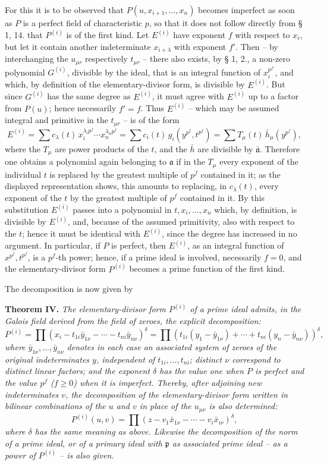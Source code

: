 \documentclass[11pt]{article}
\providecommand{\frakp}{\mathfrak p}
\providecommand{\fraka}{\mathfrak a}
\providecommand{\fraka}{\mathfrak a}
\providecommand{\frakp}{\mathfrak p}
\providecommand{\frakp}{\mathfrak p}
\begin{document}
For this it is to be observed that $P(u,x_{i+1},\ldots,x_n)$ becomes imperfect as soon as $P$ is a perfect field of characteristic $p$, so that it does not follow directly from § 1, 14. that $P^{(i)}$ is of the first kind. Let $E^{(i)}$ have exponent $f$ with respect to $x_i$, but let it contain another indeterminate $x_{i+\lambda}$ with exponent $f'$. Then -- by interchanging the $u_{\mu r}$ respectively $t_{\mu r}$ -- there also exists, by § 1, 2., a non-zero polynomial $G^{(i)}$, divisible by the ideal, that is an integral function of $x_i^{p^{f'}}$, and which, by definition of the elementary-divisor form, is divisible by $E^{(i)}$. But since $G^{(i)}$ has the same degree as $E^{(i)}$, it must agree with $E^{(i)}$ up to a factor from $P(u)$; hence necessarily $f'=f$. Thus $E^{(i)}$ -- which may be assumed integral and primitive in the $t_{\mu r}$ -- is of the form
\[
  E^{(i)}=\sum c_\lambda(t)\,x_i^{\lambda_i p^f}\cdots x_n^{\lambda_n p^f}
       =\sum c_i(t)\,g_i(y^{p^f},t^{p^f})
       =\sum T_\mu(t)\,\bar h_\mu(y^{p^f}),
\]
where the $T_\mu$ are power products of the $t$, and the $\bar h$ are divisible by $\bar{\fraka}$. Therefore one obtains a polynomial again belonging to $\fraka$ if in the $T_\mu$ every exponent of the individual $t$ is replaced by the greatest multiple of $p^f$ contained in it; as the displayed representation shows, this amounts to replacing, in $c_\lambda(t)$, every exponent of the $t$ by the greatest multiple of $p^f$ contained in it. By this substitution $E^{(i)}$ passes into a polynomial in $t,x_i,\ldots,x_n$ which, by definition, is divisible by $E^{(i)}$, and, because of the assumed primitivity, also with respect to the $t$; hence it must be identical with $E^{(i)}$, since the degree has increased in no argument. In particular, if $P$ is perfect, then $E^{(i)}$, as an integral function of $x^{p^f},t^{p^f}$, is a $p^f$-th power; hence, if a prime ideal is involved, necessarily $f=0$, and the elementary-divisor form $P^{(i)}$ becomes a prime function of the first kind.

The decomposition is now given by

\textbf{Theorem IV.} \emph{The elementary-divisor form $P^{(i)}$ of a prime ideal admits, in the Galois field derived from the field of zeroes, the explicit decomposition:}
\[
 P^{(i)}=\prod (x_i-t_{1i}\bar y_{1\nu}-\cdots-t_{ni}\bar y_{n\nu})^\delta
 =\prod (t_{1i}(y_1-\bar y_{1\nu})+\cdots+t_{ni}(y_n-\bar y_{n\nu}))^\delta,
\]
\emph{where $\bar y_{1\nu},\ldots,\bar y_{n\nu}$ denotes in each case an associated system of zeroes of the original indeterminates $y$, independent of $t_{1i},\ldots,t_{ni}$; distinct $\nu$ correspond to distinct linear factors; and the exponent $\delta$ has the value one when $P$ is perfect and the value $p^f$ ($f\ge0$) when it is imperfect. Thereby, after adjoining new indeterminates $v$, the decomposition of the elementary-divisor form written in bilinear combinations of the $u$ and $v$ in place of the $u_{\mu\nu}$ is also determined:}
\[
 P^{(i)}(u,v)=\prod (z-v_1\bar x_{1\nu}-\cdots-v_i\bar x_{i\nu})^\delta,
\]
\emph{where $\delta$ has the same meaning as above. Likewise the decomposition of the norm of a prime ideal, or of a primary ideal with $\frakp$ as associated prime ideal -- as a power of $P^{(i)}$ -- is also given.}
\end{document}
